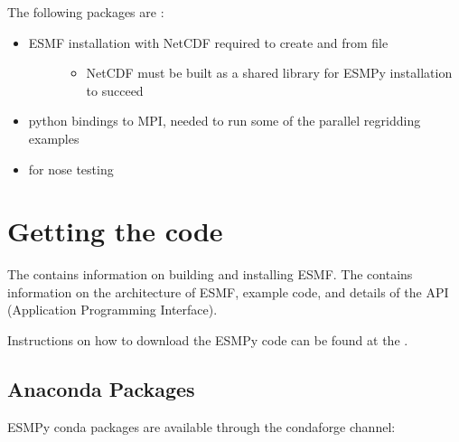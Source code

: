 \documentclass[letterpaper,10pt,english]{sphinxmanual}
\begin{document}
The following packages are :
\begin{itemize}
\item {} \begin{description}
\item[{ESMF installation with NetCDF \sphinxhyphen{} required to create {\hyperref[\detokenize{grid:ESMF.api.grid.Grid}]{}} and {\hyperref[\detokenize{mesh:ESMF.api.mesh.Mesh}]{}} from file}] \leavevmode\begin{itemize}
\item {} 
NetCDF must be built as a shared library for ESMPy installation to succeed

\end{itemize}

\end{description}

\item {} 
\sphinxhyphen{} python bindings to MPI, needed to run some of the parallel regridding examples

\item {} 
 \sphinxhyphen{} for nose testing

\end{itemize}


\section{Getting the code}
\label{\detokenize{install:getting-the-code}}
The 
contains information on building and installing ESMF.
The 
contains information on the architecture of ESMF, example code, and details of the API (Application Programming
Interface).

Instructions on how to download the ESMPy code can be found at the .


\subsection{Anaconda Packages}
\label{\detokenize{install:anaconda-packages}}
ESMPy conda packages are available through the conda\sphinxhyphen{}forge channel:
\end{document}
